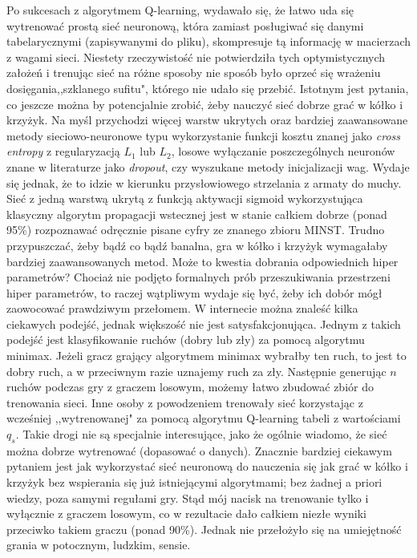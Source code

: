 \documentclass[licencjacka]{pracamgr}
\begin{document}
Po sukcesach z algorytmem Q-learning, wydawało się, że łatwo uda się wytrenować prostą sieć neuronową, która zamiast posługiwać się danymi tabelarycznymi (zapisywanymi do pliku), skompresuje tą informację w macierzach z wagami sieci. Niestety rzeczywistość nie potwierdziła tych optymistycznych założeń i trenując sieć na różne sposoby nie sposób było oprzeć się wrażeniu dosięgania,,szklanego sufitu", którego nie udało się przebić. Istotnym jest pytania, co jeszcze można by potencjalnie zrobić, żeby nauczyć sieć dobrze grać w kółko i krzyżyk.  Na myśl przychodzi więcej warstw ukrytych oraz bardziej zaawansowane metody  sieciowo-neuronowe  typu wykorzystanie funkcji kosztu znanej jako \textit{cross entropy} z regularyzacją $L_{1}$ lub $L_{2}$, losowe wyłączanie poszczególnych neuronów znane w literaturze jako \textit{dropout}, czy wyszukane metody inicjalizacji wag. Wydaje się jednak, że to idzie w kierunku przysłowiowego strzelania z armaty do muchy. Sieć z jedną warstwą ukrytą z funkcją aktywacji sigmoid wykorzystująca klasyczny algorytm propagacji wstecznej jest w stanie całkiem dobrze (ponad 95\%) rozpoznawać odręcznie pisane cyfry ze znanego zbioru MINST\cite{nn}. Trudno przypuszczać, żeby bądź co bądź banalna, gra w kółko i krzyżyk wymagałaby bardziej zaawansowanych metod. Może to kwestia dobrania odpowiednich hiper parametrów? Chociaż nie podjęto formalnych  prób przeszukiwania przestrzeni hiper parametrów, to raczej wątpliwym wydaje się być, żeby ich dobór mógł zaowocować prawdziwym przełomem.  W internecie można znaleść kilka ciekawych podejść, jednak większość  nie jest satysfakcjonująca. Jednym z takich podejść jest klasyfikowanie ruchów (dobry lub zły) za pomocą algorytmu minimax. Jeżeli gracz grający algorytmem minimax wybrałby ten ruch, to jest to dobry ruch, a w przeciwnym razie uznajemy ruch za zły. Następnie generując $n$ ruchów podczas gry z graczem losowym, możemy łatwo zbudować zbiór do trenowania sieci. Inne osoby z powodzeniem trenowały sieć korzystając z wcześniej ,,wytrenowanej" za pomocą algorytmu Q-learning tabeli z wartościami $q_{s}$.  Takie drogi nie są specjalnie interesujące, jako że ogólnie wiadomo, że sieć można dobrze wytrenować (dopasować o danych). Znacznie bardziej ciekawym pytaniem jest jak wykorzystać sieć neuronową do nauczenia się  jak grać w kółko i krzyżyk bez wspierania się już istniejącymi algorytmami; bez żadnej a priori wiedzy, poza samymi regułami gry. Stąd mój nacisk na trenowanie tylko i wyłącznie z graczem losowym, co w rezultacie dało całkiem niezłe wyniki przeciwko takiem graczu (ponad 90\%).  Jednak nie przełożyło się na umiejętność grania w potocznym, ludzkim, sensie. \\
\end{document}
